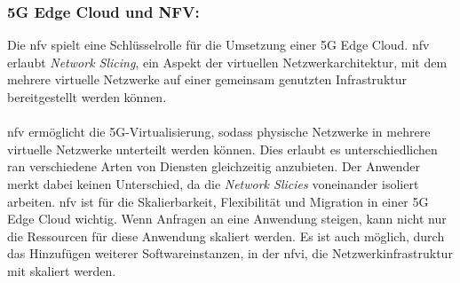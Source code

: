 \documentclass[runningheads]{llncs}
\numberwithin{figure}{section}
\begin{document}
\subsubsection{5G Edge Cloud und NFV:}
Die \acrlong{nfv} spielt eine Schlüsselrolle für die Umsetzung einer 5G Edge Cloud.
\acrshort{nfv} erlaubt \textit{Network Slicing}, ein Aspekt der virtuellen Netzwerkarchitektur, 
mit dem mehrere virtuelle Netzwerke auf einer gemeinsam genutzten Infrastruktur bereitgestellt werden können. \cite{suzhiSpaceEdgeCloud2019}
\\
\\
\acrshort{nfv} ermöglicht die 5G-Virtualisierung, sodass physische Netzwerke in mehrere virtuelle Netzwerke unterteilt werden können. 
Dies erlaubt es unterschiedlichen \acrfull{ran} verschiedene Arten von Diensten gleichzeitig anzubieten. 
Der Anwender merkt dabei keinen Unterschied, da die \textit{Network Slicies} voneinander isoliert arbeiten. 
\acrshort{nfv} ist für die Skalierbarkeit, Flexibilität und Migration in einer 5G Edge Cloud wichtig. Wenn Anfragen an eine
Anwendung steigen, kann nicht nur die Ressourcen für diese Anwendung skaliert werden. Es ist auch möglich, durch das Hinzufügen weiterer
Softwareinstanzen, in der \acrfull{nfvi}, die Netzwerkinfrastruktur mit skaliert werden. \cite{How5GNFV} \cite{etsiNetworkFunctionsVirtualisation}
\newpage
\end{document}
